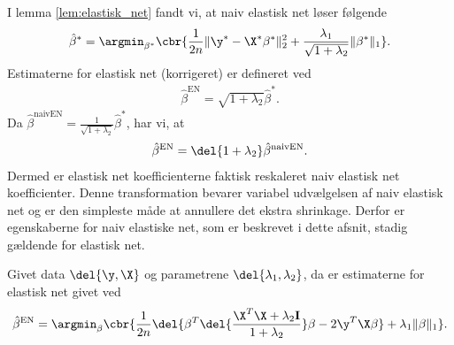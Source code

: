 I lemma \ref{lem:elastisk_net} fandt vi, at naiv elastisk net løser følgende 
\begin{align}
\hat{\beta}^* = \argmin_{\beta^*} \cbr{\frac{1}{2n} \Vert \y^* - \X^* \beta^* \Vert_2^2 + \frac{\lambda_1}{\sqrt{1+\lambda_2}} \Vert \beta^* \Vert_1}. \label{eq:EN8}
\end{align}
Estimaterne for elastisk net (korrigeret) er defineret ved
\begin{align*}
\hat{\beta}^\text{EN} = \sqrt{1+\lambda_2} \hat{\beta}^*.
\end{align*}
Da \(\hat{\beta}^\text{naivEN} = \frac{1}{\sqrt{1+\lambda_2}} \hat{\beta}^*\), har vi, at
\begin{align*}
\hat{\beta}^\text{EN} = \del{1+\lambda_2} \hat{\beta}^\text{naivEN}.
\end{align*}
Dermed er elastisk net koefficienterne faktisk reskaleret naiv elastisk net koefficienter.
Denne transformation bevarer variabel udvælgelsen af naiv elastisk net og er den simpleste måde at annullere det ekstra shrinkage.
Derfor er egenskaberne for naiv elastiske net, som er beskrevet i dette afsnit, stadig gældende for elastisk net.
%
\begin{thm} \label{thm:elastisk_net2}
Givet data \(\del{\y, \X}\) og parametrene \(\del{\lambda_1, \lambda_2}\), da er estimaterne for elastisk net givet ved
\begin{align}
\hat{\beta}^\text{EN} = \argmin_\beta \cbr{ \frac{1}{2n} \del{\beta^T \del{\frac{\X^T \X + \lambda_2 \mathbf{I}}{1 + \lambda_2}} \beta - 2 \y^T \X \beta} + \lambda_1 \Vert \beta \Vert_1}. \label{eq:EN6}
\end{align}
\end{thm}
